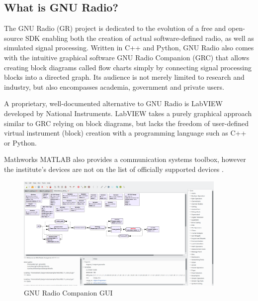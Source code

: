\subsection{What is GNU Radio?}

\label{sec:gnu-radio}

The GNU Radio (GR) project is dedicated to the evolution of a free and open-source SDK enabling both the creation of actual software-defined radio, as well as simulated signal processing. Written in C++ and Python, GNU Radio also comes with the intuitive graphical software GNU Radio Companion (GRC) that allows creating block diagrams called flow charts simply by connecting signal processing blocks into a directed graph. Its audience is not merely limited to research and industry, but also encompasses academia, government and private users.

A proprietary, well-documented alternative to GNU Radio is LabVIEW developed by National Instruments. LabVIEW takes a purely graphical approach similar to GRC relying on block diagrams, but lacks the freedom of user-defined virtual instrument (block) creation with a programming language such as C++ or Python.

Mathworks MATLAB also provides a communication systems toolbox, however the institute's devices are not on the list of officially supported devices \cite{Matlab}.

\begin{figure}[t]
	\label{fig:gnuradio}
	\begin{center}
		\includegraphics[width=0.9\textwidth,valign=c]{pictures/grc_ui}
	\end{center}
	\caption{GNU Radio Companion GUI}
\end{figure}

